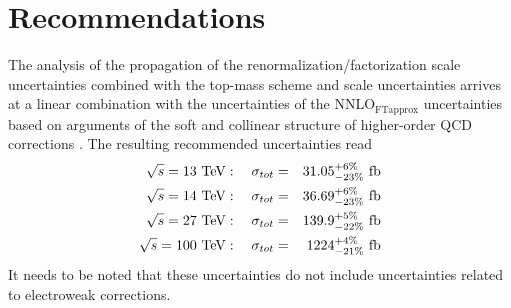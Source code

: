 \section{Recommendations}
The analysis of the propagation of the renormalization/factorization scale uncertainties combined with the top-mass scheme and scale uncertainties arrives at a linear combination with the uncertainties of the NNLO$_{\mbox{FTapprox}}$ uncertainties based on arguments of the soft and collinear structure of higher-order QCD corrections \cite{Baglio:2020wgt}. The resulting recommended uncertainties read
\begin{eqnarray}
\sqrt{s} = 13~{\rm TeV}: \quad 
\sigma_{tot} & = & 31.05^{+6\%}_{-23\%}~{\rm fb} \\
\sqrt{s} = 14~{\rm TeV}: \quad
\sigma_{tot} & = & 36.69^{+6\%}_{-23\%}~{\rm fb} \\
\sqrt{s} = 27~{\rm TeV}: \quad
\sigma_{tot} & = & 139.9^{+5\%}_{-22\%}~{\rm fb} \\
\sqrt{s} = 100~{\rm TeV}: \quad 
\sigma_{tot} & = & 1224^{+4\%}_{-21\%}~{\rm fb}
\end{eqnarray}
It needs to be noted that these uncertainties do not include uncertainties related to electroweak corrections.

